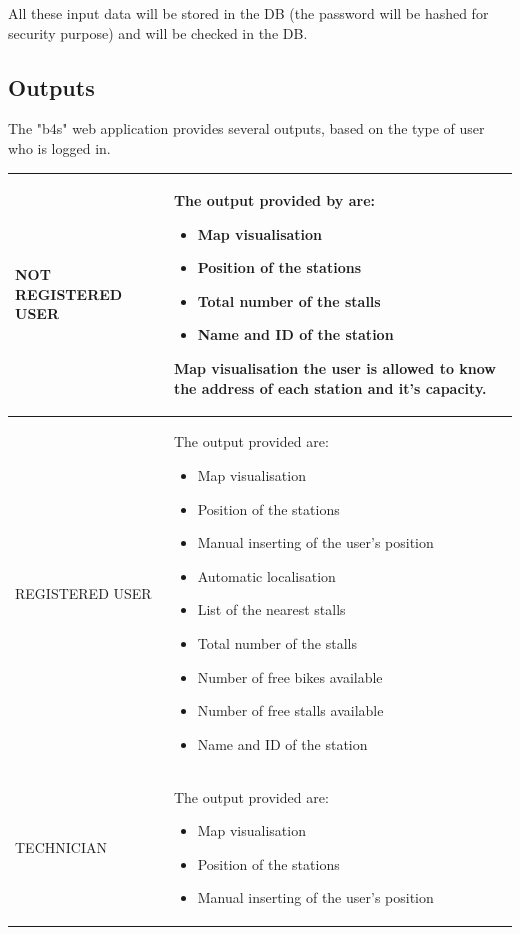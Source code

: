 \documentclass{article}
\begin{document}
 All these input data will be stored in the DB (the password will be hashed for security purpose) and will be checked in the DB.
 
\subsection{Outputs}
The "b4s" web application provides several outputs, based on the type of user who is logged in.

\begin{longtable}{|l|p{}|}
            \hline
            NOT REGISTERED USER &  The output provided by are:
            \begin{itemize}
            \item Map visualisation
            \item Position of the stations
            \item Total number of the stalls
            \item Name and ID of the station 
            \end{itemize}
            Map visualisation the user is allowed to know the address of each station and it's capacity. \\ 
            \hline
            REGISTERED USER  & The output provided are:
            \begin{itemize}
            \item Map visualisation
            \item Position of the stations
            \item Manual inserting of the user's position
            \item Automatic localisation
            \item List of the nearest stalls
            \item Total number of the stalls
            \item Number of free bikes available
            \item Number of free stalls available
            \item Name and ID of the station 
            \end{itemize}
            \\
            \hline
            TECHNICIAN &  The output provided are:
            \begin{itemize}
            \item Map visualisation
            \item Position of the stations
            \item Manual inserting of the user's position

\end{itemize}
\end{longtable}
\end{document}
